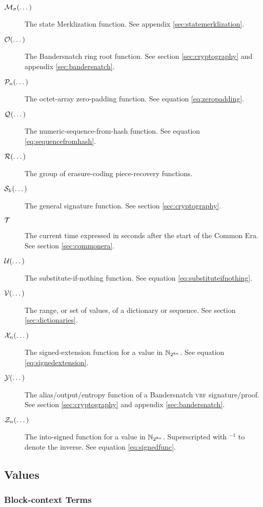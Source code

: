 \begin{description}
  \item[$\merklizestate{\dots}$] The state Merklization function. See appendix \ref{sec:statemerklization}.
  \item[$\getringroot{\dots}$] The Bandersnatch ring root function. See section \ref{sec:cryptography} and appendix \ref{sec:bandersnatch}.
  \item[$\zeropad{n}{\dots}$] The octet-array zero-padding function. See equation \ref{eq:zeropadding}.
  \item[$\seqfromhash{}{\dots}$] The numeric-sequence-from-hash function. See equation \ref{eq:sequencefromhash}.
  \item[$\ecrecover{\dots}$] The group of erasure-coding piece-recovery functions.
  \item[$\signdata{k}{\dots}$] The general signature function. See section \ref{sec:cryptography}.
  \item[$\mathcal{T}$] The current time expressed in seconds after the start of the \Jam Common Era. See section \ref{sec:commonera}.
  \item[$\subifnone{\dots}$] The substitute-if-nothing function. See equation \ref{eq:substituteifnothing}.
  \item[$\values{\dots}$] The range, or set of values, of a dictionary or sequence. See section \ref{sec:dictionaries}.
  \item[$\sext{n}{\dots}$] The signed-extension function for a value in $\mathbb{N}_{2^{8n}}$. See equation \ref{eq:signedextension}.
  \item[$\banderout{\dots}$] The alias/output/entropy function of a Bandersnatch \textsc{vrf} signature/proof. See section \ref{sec:cryptography} and appendix \ref{sec:bandersnatch}.
  \item[$\mathcal{Z}_{n}(\dots)$] The into-signed function for a value in $\mathbb{N}_{2^{8n}}$. Superscripted with ${}^{-1}$ to denote the inverse. See equation \ref{eq:signedfunc}.
\end{description}

\subsection{Values}

\subsubsection{Block-context Terms}

